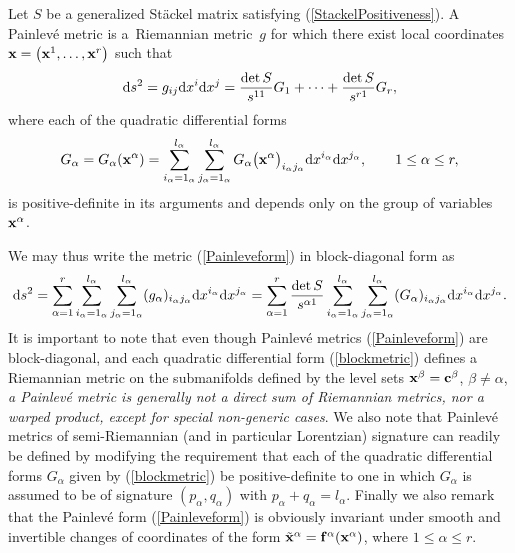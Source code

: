 \documentclass[pdftex]{sigma}
\numberwithin{equation}{section}
\newcommand{\ialpha}{i_{\alpha}}
\newcommand{\jalpha}{j_{\alpha}}
\newcommand{\lalpha}{l_{\alpha}}
\begin{document}
\begin{Definition} \label{Painleve}
Let $S$ be a generalized St\"ackel matrix satisfying (\ref{StackelPositiveness}). A Painlev\'e metric is a~Riemannian metric~$g$ for which there exist local coordinates ${\bf x}=\big({\bf x}^{1},\dots,{\bf x}^{r}\big)$ such that
\begin{gather}\label{Painleveform}
{\rm d}s^{2}=g_{ij}{\rm d}x^{i}{\rm d}x^{j}=\frac{\det S}{s^{11}} G_1 +\cdots+\frac{\det S}{s^{r1}} G_r,
\end{gather}
where each of the quadratic differential forms
\begin{gather}\label{blockmetric}
G_{\alpha}=G_{\alpha}({{\bf x}^{\alpha}})=\sum_{i_{\alpha}=1_{\alpha}}^{l_{\alpha}}\sum_{j_{\alpha}=1_{\alpha}}^{l_{\alpha}}G_{\alpha}\big({{\bf x}^{\alpha}}\big)_{i_{\alpha}j_{\alpha}}{\rm d}x^{i_{\alpha}}{\rm d}x^{j_{\alpha}},\qquad 1\leq \alpha \leq r,
\end{gather}
is positive-definite in its arguments and depends only on the group of variables ${\bf x}^{\alpha}$.
\end{Definition}
We may thus write the metric (\ref{Painleveform}) in block-diagonal form as
\[
{\rm d}s^{2}=\sum_{\alpha =1}^{r}\sum_{\ialpha = 1_{\alpha}}^{\lalpha}\sum_{\jalpha = 1_{\alpha}}^{\lalpha}(g_{\alpha})_{\ialpha \jalpha}{\rm d}x^{\ialpha}{\rm d}x^{\jalpha}=\sum_{\alpha =1}^{r} \frac{\det S}{s^{\alpha 1}} \sum_{\ialpha = 1_{\alpha}}^{\lalpha}\sum_{\jalpha = 1_{\alpha}}^{\lalpha}(G_{\alpha})_{i_{\alpha}j_{\alpha}}{\rm d}x^{i_{\alpha}}{\rm d}x^{j_{\alpha}}.
\]
It is important to note that even though Painlev\'e metrics (\ref{Painleveform}) are block-diagonal, and each quadratic differential form (\ref{blockmetric}) defines a Riemannian metric on the submanifolds defined by the level sets ${\bf x}^{\beta}={\bf{c}}^{\beta}$, $\beta\neq \alpha$, {\emph {a Painlev\'e metric is generally not a direct sum of Riemannian metrics, nor a warped product, except for special non-generic cases}}. We also note that Painlev\'e metrics of semi-Riemannian (and in particular Lorentzian) signature can readily be defined by modifying the requirement that each of the quadratic differential forms $G_{\alpha}$ given by (\ref{blockmetric}) be positive-definite to one in which $G_{{\alpha}}$ is assumed to be of signature $(p_{\alpha},q_{\alpha})$ with $p_{\alpha}+q_{\alpha}=l_{\alpha}$. Finally we also remark that the Painlev\'e form (\ref{Painleveform}) is obviously invariant under smooth and invertible changes of coordinates of the form ${\tilde{\bf x}}^{\alpha}={\bf{f}}^{\alpha}({\bf x}^{\alpha})$, where $1\leq \alpha \leq r$.
\end{document}
